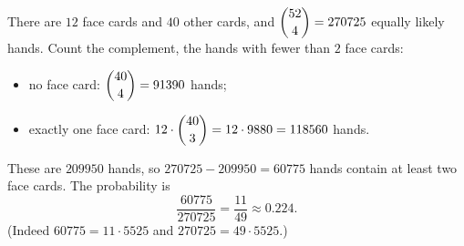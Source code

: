There are $12$ face cards and $40$ other cards, and $\dbinom{52}{4}=270725$ equally likely hands. Count the complement, the hands with fewer than $2$ face cards:
\begin{itemize}
\item no face card: $\dbinom{40}{4}=91390$ hands;
\item exactly one face card: $12\cdot\dbinom{40}{3}=12\cdot9880=118560$ hands.
\end{itemize}
These are $209950$ hands, so $270725-209950=60775$ hands contain at least two face cards. The probability is
\[\dfrac{60775}{270725}=\boxed{\dfrac{11}{49}}\approx0.224 .\]
(Indeed $60775=11\cdot5525$ and $270725=49\cdot5525$.)

